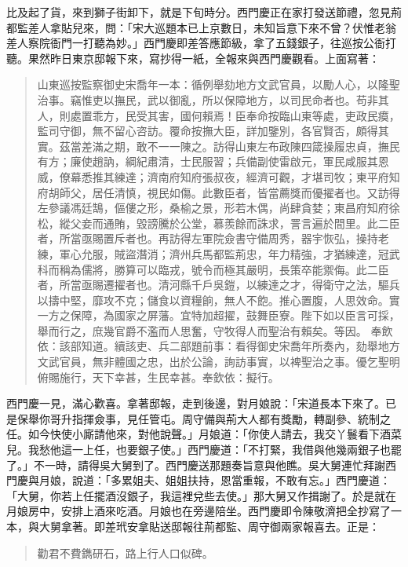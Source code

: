 比及起了貨，來到獅子街卸下，就是下旬時分。西門慶正在家打發送節禮，忽見荊都監差人拿貼兒來，問：「宋大巡題本已上京數日，未知旨意下來不曾？伏惟老翁差人察院衙門一打聽為妙。」西門慶即差答應節級，拿了五錢銀子，往巡按公衙打聽。果然昨日東京邸報下來，寫抄得一紙，全報來與西門慶觀看。上面寫著：
\begin{quote}
山東巡按監察御史宋喬年一本：循例舉劾地方文武官員，以勵人心，以隆聖治事。竊惟吏以撫民，武以御亂，所以保障地方，以司民命者也。苟非其人，則處置乖方，民受其害，國何賴焉！臣奉命按臨山東等處，吏政民瘼，監司守御，無不留心咨訪。覆命按撫大臣，詳加鑒別，各官賢否，頗得其實。茲當差滿之期，敢不一一陳之。訪得山東左布政陳四箴操履忠貞，撫民有方；廉使趙訥，綱紀肅清，士民服習；兵備副使雷啟元，軍民咸服其恩威，僚幕悉推其練達；濟南府知府張叔夜，經濟可觀，才堪司牧；東平府知府胡師父，居任清慎，視民如傷。此數臣者，皆當薦獎而優擢者也。又訪得左參議馮廷鵠，傴僂之形，桑榆之景，形若木偶，尚肆貪婪；東昌府知府徐松，縱父妾而通賄，毀謗騰於公堂，慕羨餘而誅求，詈言遍於間里。此二臣者，所當亟賜置斥者也。再訪得左軍院僉書守備周秀，器宇恢弘，操持老練，軍心允服，賊盜潛消；濟州兵馬都監荊忠，年力精強，才猶練達，冠武科而稱為儒將，勝算可以臨戎，號令而極其嚴明，長策卒能禦侮。此二臣者，所當亟賜遷擢者也。清河縣千戶吳鎧，以練達之才，得衛守之法，驅兵以擣中堅，靡攻不克；儲食以資糧餉，無人不飽。推心置腹，人思效命。實一方之保障，為國家之屏藩。宜特加超擢，鼓舞臣寮。陛下如以臣言可採，舉而行之，庶幾官爵不濫而人思奮，守牧得人而聖治有賴矣。等因。
奉飲依：該部知道。續該吏、兵二部題前事：看得御史宋喬年所奏內，劾舉地方文武官員，無非體國之忠，出於公論，詢訪事實，以裨聖治之事。優乞聖明俯賜施行，天下幸甚，生民幸甚。奉欽依：擬行。
\end{quote}

西門慶一見，滿心歡喜。拿著邸報，走到後邊，對月娘說：「宋道長本下來了。已是保舉你哥升指揮僉事，見任管屯。周守備與荊大人都有獎勵，轉副參、統制之任。如今快使小廝請他來，對他說聲。」月娘道：「你使人請去，我交丫鬟看下酒菜兒。我愁他這一上任，也要銀子使。」西門慶道：「不打緊，我借與他幾兩銀子也罷了。」不一時，請得吳大舅到了。西門慶送那題奏旨意與他瞧。吳大舅連忙拜謝西門慶與月娘，說道：「多累姐夫、姐姐扶持，恩當重報，不敢有忘。」西門慶道：「大舅，你若上任擺酒沒銀子，我這裡兌些去使。」那大舅又作揖謝了。於是就在月娘房中，安排上酒來吃酒。月娘也在旁邊陪坐。西門慶即令陳敬濟把全抄寫了一本，與大舅拿著。即差玳安拿貼送邸報往荊都監、周守御兩家報喜去。正是：
\begin{quote}
勸君不費鐫研石，路上行人口似碑。
\end{quote}
